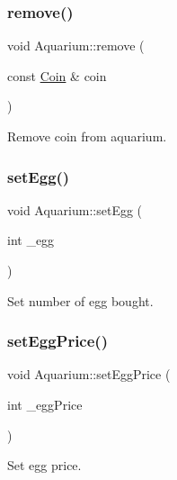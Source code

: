 \mbox{\label{class_aquarium_aa42e6fbc3cb8445f07875e5f8c127892}} 
\subsubsection{\texorpdfstring{remove()}{remove()}\hspace{0.1cm}{\footnotesize\ttfamily [5/5]}}
{\footnotesize\ttfamily void Aquarium\+::remove (\begin{DoxyParamCaption}\item[{const \mbox{\hyperlink{class_coin}{Coin}} \&}]{coin }\end{DoxyParamCaption})}



Remove coin from aquarium. 

\mbox{\label{class_aquarium_aa9398d7691f5c443459d4b38a9be5483}} 
\subsubsection{\texorpdfstring{set\+Egg()}{setEgg()}}
{\footnotesize\ttfamily void Aquarium\+::set\+Egg (\begin{DoxyParamCaption}\item[{int}]{\+\_\+egg }\end{DoxyParamCaption})}



Set number of egg bought. 

\mbox{\label{class_aquarium_a08863cdaa6016dccc8e35be9171be652}} 
\subsubsection{\texorpdfstring{set\+Egg\+Price()}{setEggPrice()}}
{\footnotesize\ttfamily void Aquarium\+::set\+Egg\+Price (\begin{DoxyParamCaption}\item[{int}]{\+\_\+egg\+Price }\end{DoxyParamCaption})}



Set egg price. 


